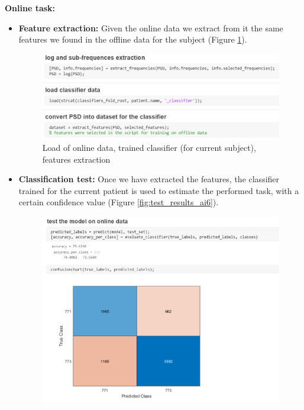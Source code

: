 \noindent
{\Large\textbf{Online task:}}

\begin{itemize}
\item \textbf{Feature extraction:} Given the online data we extract from it the same features we found in the offline data for the subject (Figure \ref{fig:load_online_data_classifier_features_extraction}). 

\begin{figure}[h!]
	\begin{center}
		 \includegraphics[width=0.7\linewidth]{img/code_load_online_and_features_extraction.PNG}
	\end{center}

	 \caption{Load of online data, trained classifier (for current subject), features  extraction}
	 \label{fig:load_online_data_classifier_features_extraction}
\end{figure}



\item \textbf{Classification test:} Once we have extracted the features, the classifier trained for the current patient is used to estimate the performed task, with a certain confidence value (Figure \ref{fig:test_results_ai6}). \\

\begin{figure}[h!]
	\begin{center}
		 \includegraphics[width=0.7\linewidth]{img/code_test_set_results_ai6.PNG}
	\end{center}


\end{figure}
\end{itemize}
